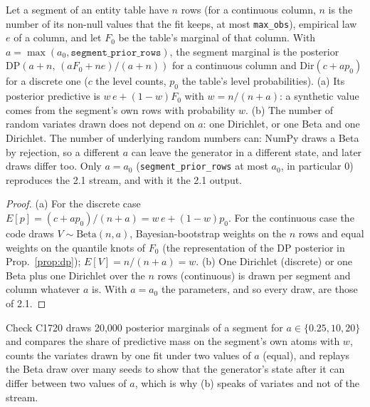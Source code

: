 \setcounter{proposition}{1719}
\begin{proposition}\label{prop:segshrink}
Let a segment of an entity table have $n$ rows (for a continuous column, $n$ is the number of its non-null values that the fit keeps, at most \texttt{max\_obs}), empirical law $e$ of a column, and let $F_0$ be the table's marginal of that column. With $a=\max(a_0,\texttt{segment\_prior\_rows})$, the segment marginal is the posterior $\mathrm{DP}(a+n,\,(aF_0+ne)/(a+n))$ for a continuous column and $\mathrm{Dir}(c+ap_0)$ for a discrete one ($c$ the level counts, $p_0$ the table's level probabilities). (a) Its posterior predictive is $w\,e+(1-w)F_0$ with $w=n/(n+a)$: a synthetic value comes from the segment's own rows with probability $w$. (b) The number of random variates drawn does not depend on $a$: one Dirichlet, or one Beta and one Dirichlet. The number of underlying random numbers can: NumPy draws a Beta by rejection, so a different $a$ can leave the generator in a different state, and later draws differ too. Only $a=a_0$ (\texttt{segment\_prior\_rows} at most $a_0$, in particular 0) reproduces the 2.1 stream, and with it the 2.1 output.
\end{proposition}
\begin{proof}
(a) For the discrete case $E[p]=(c+ap_0)/(n+a)=w\,e+(1-w)p_0$. For the continuous case the code draws $V\sim\mathrm{Beta}(n,a)$, Bayesian-bootstrap weights on the $n$ rows and equal weights on the quantile knots of $F_0$ (the representation of the DP posterior in Prop.~\ref{prop:dp}); $E[V]=n/(n+a)=w$. (b) One Dirichlet (discrete) or one Beta plus one Dirichlet over the $n$ rows (continuous) is drawn per segment and column whatever $a$ is. With $a=a_0$ the parameters, and so every draw, are those of 2.1.
\end{proof}
\noindent Check C1720 draws 20{,}000 posterior marginals of a segment for $a\in\{0.25,10,20\}$ and compares the share of predictive mass on the segment's own atoms with $w$, counts the variates drawn by one fit under two values of $a$ (equal), and replays the Beta draw over many seeds to show that the generator's state after it can differ between two values of $a$, which is why (b) speaks of variates and not of the stream.


